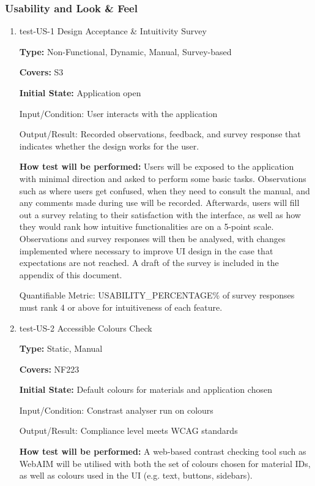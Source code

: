 \documentclass[12pt, titlepage]{article}
\begin{document}
\subsubsection{Usability and Look \& Feel}

\begin{enumerate}

\item{test-US-1 Design Acceptance \& Intuitivity Survey\\}
\label{sec:t-nf-1}

\textbf{Type:} Non-Functional, Dynamic, Manual, Survey-based

\textbf{Covers:} S3
					
\textbf{Initial State:} Application open
					
Input/Condition: User interacts with the application
					
Output/Result: Recorded observations, feedback, and survey response that indicates whether the design works for the user.
					
\textbf{How test will be performed:} Users will be exposed to the application with minimal direction and asked to perform 
some basic tasks. Observations such as where users get confused, when they need to consult the manual, and any comments
made during use will be recorded. Afterwards, users will fill out a survey relating to their satisfaction with the interface, 
as well as how they would rank how intuitive functionalities are on a 5-point scale. Observations and survey responses will then be analysed, with
changes implemented where necessary to improve UI design in the case that expectations are not reached. A draft of the survey
is included in the appendix of this document.

Quantifiable Metric: USABILITY\_PERCENTAGE\% of survey responses must rank 4 or above for intuitiveness of each feature.

\item{test-US-2 Accessible Colours Check\\}
\label{sec:t-nf-2}

\textbf{Type:} Static, Manual

\textbf{Covers:} NF223
					
\textbf{Initial State:} Default colours for materials and application chosen
					
Input/Condition: Constrast analyser run on colours
					
Output/Result: Compliance level meets WCAG standards
					
\textbf{How test will be performed:} A web-based contrast checking tool such as WebAIM will be utilised with both the set of colours chosen 
for material IDs, as well as colours used in the UI (e.g. text, buttons, sidebars).


\end{enumerate}
\end{document}
